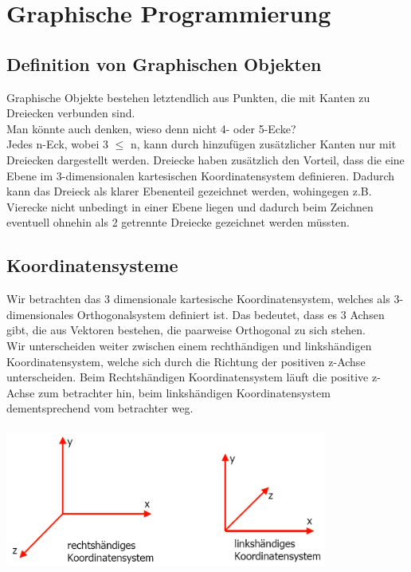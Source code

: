 \section{Graphische Programmierung}

\subsection{Definition von Graphischen Objekten}
Graphische Objekte bestehen letztendlich aus Punkten, die mit Kanten zu Dreiecken verbunden sind.\\
Man könnte auch denken, wieso denn nicht 4- oder 5-Ecke?\\
Jedes n-Eck, wobei 3 $\leq$ n, kann durch hinzufügen zusätzlicher Kanten nur mit Dreiecken dargestellt werden. Dreiecke haben zusätzlich den Vorteil, dass die eine Ebene im 3-dimensionalen kartesischen Koordinatensystem definieren. Dadurch kann das Dreieck als klarer Ebenenteil gezeichnet werden, wohingegen z.B. Vierecke nicht unbedingt in einer Ebene liegen und dadurch beim Zeichnen eventuell ohnehin als 2 getrennte Dreiecke gezeichnet werden müssten.\\

\subsection{Koordinatensysteme}
Wir betrachten das 3 dimensionale kartesische Koordinatensystem, welches als 3-dimensionales Orthogonalsystem definiert ist. Das bedeutet, dass es 3 Achsen gibt, die aus Vektoren bestehen, die paarweise Orthogonal zu sich stehen.\\
Wir unterscheiden weiter zwischen einem rechthändigen und linkshändigen Koordinatensystem, welche sich durch die Richtung der positiven z-Achse unterscheiden. Beim Rechtshändigen Koordinatensystem läuft die positive z-Achse zum betrachter hin, beim linkshändigen Koordinatensystem dementsprechend vom betrachter weg.
\\\\

\includegraphics[width=400px]{images/Koordinatensysteme.png}

